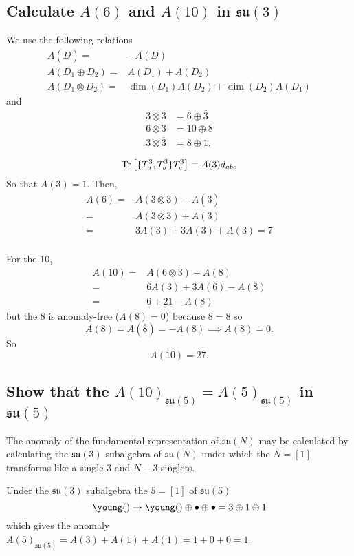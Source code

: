 \documentclass[main.tex]{subfiles}
\begin{document}
\subsection{Calculate $A(6)$ and $A(10)$ in $\mathfrak{su}(3)$}
We use the following relations
\begin{align}
A(\overline{D})=&-A(D)\\
A(D_1\oplus D_2)=&A(D_1)+A(D_2)\\
A(D_1\otimes D_2)=&\dim{(D_1)}A(D_2)+\dim{(D_2)}A(D_1)
\end{align}
and 
\begin{align}
3\otimes3&=6\oplus\overline{3}\\
6\otimes3&=10\oplus8\\
3\otimes\overline{3}&=8\oplus1.
\end{align}

\begin{equation}
\operatorname{Tr}{\left[\{T_a^3,T_b^3\}T_c^3\right]}\equiv A(3)d_{abc}
\end{equation}
So that $A(3)=1$. Then,
\begin{align}
A(6)=&A(3\otimes3)-A(\overline{3})\\
=&A(3\otimes3)+A(3)\\
=&3A(3)+3A(3)+A(3)=7\\
\end{align}

For the $10$,
\begin{align}
A(10)=&A(6\otimes3)-A(8)\\
=&6A(3)+3A(6)-A(8)\\
=&6+21-A(8)
\end{align}
but the $8$ is anomaly-free ($A(8)=0$) because $8=\overline{8}$ so
\begin{equation}
A(8)=A(\overline{8})=-A(8)\implies A(8)=0.
\end{equation}
So
\begin{equation}
A(10)=27.
\end{equation}
\subsection{Show that the $A(10)_{\mathfrak{su}(5)}=A(5)_{\mathfrak{su}(5)}$ in $\mathfrak{su}(5)$}
The anomaly of the fundamental representation of $\mathfrak{su}(N)$ may be calculated by calculating the $\mathfrak{su}(3)$ subalgebra of $\mathfrak{su}(N)$ under which the $N=[1]$
 transforms like a single $3$ and $N-3$ singlets. 
 
Under the $\mathfrak{su}(3)$ subalgebra the $5=[1]$ of $\mathfrak{su}(5)$
\begin{equation}
\young(\hfil)\rightarrow\young(\hfil)\oplus\bullet\oplus\bullet=3\oplus1\oplus1
\end{equation}  
which gives the anomaly $A(5)_{\mathfrak{su}(5)}=A(3)+A(1)+A(1)=1+0+0=1$.
\end{document}
